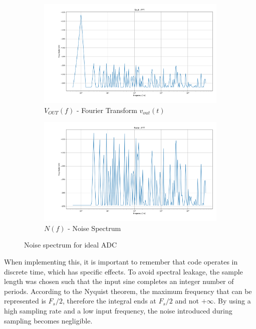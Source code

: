 \begin{figure}[h]
    \begin{subfigure}[b]{0.4\textwidth}
        \centering
        \includegraphics[width=\textwidth]{Images/Dout_ideal.png}
        \caption{$V_{OUT}(f)$ - Fourier Transform $v_{out}(t)$} 
        \label{fig:Vout_freq_ideal}
    \end{subfigure}%
    \begin{subfigure}[b]{0.4\textwidth}
        \centering
        \includegraphics[width=\textwidth]{Images/Noise_Ideal.png}
        \caption{$N(f)$ - Noise Spectrum}
        \label{fig:Noise_freq_ideal}
    \end{subfigure}

    \caption{Noise spectrum for ideal ADC}
    \label{fig:Noise Ideal}
\end{figure}

When implementing this, it is important to remember that code operates in discrete time, which has specific effects.  To avoid spectral leakage, the sample length was chosen such that the input sine completes an integer number of periods. According to the Nyquist theorem, the maximum frequency that can be represented is $F_s/2$, therefore the integral ends at $F_s/2$ and not $+\infty$. By using a high sampling rate and a low input frequency, the noise introduced during sampling becomes negligible.

